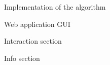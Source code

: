 \documentclass[9pt]{extarticle}
\begin{document}
\begin{section}{Implementation of the algorithm}
\begin{subsection}{Web application GUI}
\begin{subsubsection}{Interaction section}


            \end{subsubsection}

            \begin{subsubsection}{Info section}
                


\end{subsubsection}
\end{subsection}
\end{section}
\end{document}
